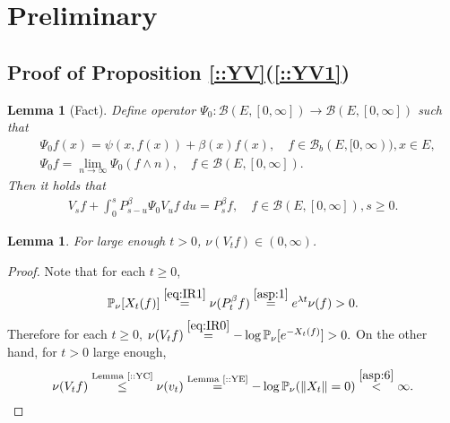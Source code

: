 \documentclass[12pt,a4paper]{amsart}
\numberwithin{equation}{section}
\theoremstyle{plain}
\newtheorem{lem}[thm]{Lemma}
\theoremstyle{definition}
\theoremstyle{remark}
\begin{document}
\section{Preliminary}
\subsection{Proof of Proposition \ref{::YV}(\ref{::YV1})} \label{sec:PS}

\begin{lem}[Fact] \label{lem:PSF}
Define operator $\Psi_0: \mathcal B(E, [0,\infty]) \to \mathcal B(E,[0,\infty])$ such that
\begin{align}
  & \Psi_0 f(x) 
  = \psi(x,f(x))+\beta(x)f(x), 
  \quad f\in \mathcal B_b(E,[0,\infty)), x\in E,
  \\ & \Psi_0 f 
       = \lim_{n\to \infty} \Psi_0 (f\wedge n), 
       \quad f\in \mathcal B(E,[0,\infty]).
\end{align}
Then it holds that
\begin{align}
  \label{eq:PS1}
  V_s f + \int_0^s P_{s-u}^\beta \Psi_0 V_{u} f ~du
  = P_s^\beta f,
  \quad f\in \mathcal B(E,[0,\infty]), s\geq 0.
\end{align}
\end{lem}
  
\begin{lem} \label{clm:PSL} 
  For large enough $t>0$, $ \nu(V_tf) \in (0,\infty)$. 
\end{lem}

\begin{proof}
  Note that for each $t\geq 0$, 
  \[ \mathbb P_\nu[X_t (f)] \overset{\eqref{eq:IR1}}{=} \nu (P_t^\beta f) \overset{\ref{asp:1}}= e^{\lambda t}\nu (f)>0.\] 
  Therefore for each $t\geq 0$, $ \nu(V_tf) \overset{\eqref{eq:IR0}}{=} -\log  \mathbb P_\nu[e^{-X_t (f)}] > 0.$ On the other hand, for $t>0$ large enough, 
  \[ \nu (V_tf) \overset{\text{Lemma \ref{::YC}}}{\leq} \nu (v_t) \overset{\text{Lemma \ref{::YE}}}{=} -\log \mathbb P_\nu(\|X_t\| = 0) \overset{\ref{asp:6}}{<} \infty. \qedhere \]
\end{proof}

\begin{comment}
  \begin{lem}[Fact]
    \label{lem:E}
    Let $X$ be the superprocess . 
    Define a function $\psi_0$ on $E\times [0,\infty)$ such that $ \psi_0(x,z)  := \psi(x,z)+ \beta(x) z$ for each  $x\in E$ and  $z \geq 0$.
    Using the monotonicity, extend $\psi$ as a $[0,\infty]$-valued function on $E \times [0,\infty]$ by setting that $\psi(x,\infty) = \lim_{z\uparrow \infty} \psi(x,z)$.
    Define operator $\Psi_0$ on $\mathcal B(E,[0,\infty])$ by $ \Psi_0 g(x):=\psi_0(x, g(x))$.
    Then we have
    \begin{align}
      V_sf+ \int_0^s P_{s-u}^\beta \Psi_0V_u f du = P_s^\beta f,
      \quad s\geq 0, f\in \mathcal B(E, [0,\infty]).
    \end{align}
  \end{lem}
\end{comment}
\end{document}
